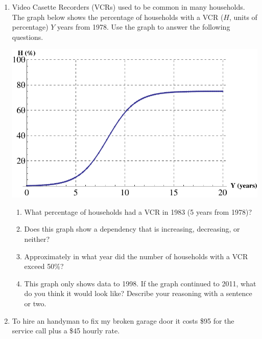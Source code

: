 \documentclass[12pt]{article}
\begin{document}
\hrulefill


\newpage
\begin{enumerate}
\item Video Casette Recorders (VCRs) used to be common in many households.  The graph below shows the percentage of households with a VCR ($H$, units of percentage) $Y$ years from 1978.  Use the graph to answer the following questions.

\begin{center}
 {\includegraphics [width = 8in] {vcr}}
\end{center}



\begin{enumerate}
\item What percentage of households had a VCR in 1983 (5 years from 1978)?
\vfill
\item Does this graph show a dependency that is increasing, decreasing, or neither?
\vfill
\item Approximately in what year did the number of households with a VCR exceed 50\%?
\vfill
\item This graph only shows data to 1998.  If the graph continued to 2011, what do you think it would look like?  Describe your reasoning with a sentence or two.
\vfill
\end{enumerate}
\newpage
\item  To hire an handyman to fix my broken garage door it costs \$95 for the service call plus a \$45 hourly rate.


\end{enumerate}
\end{document}
